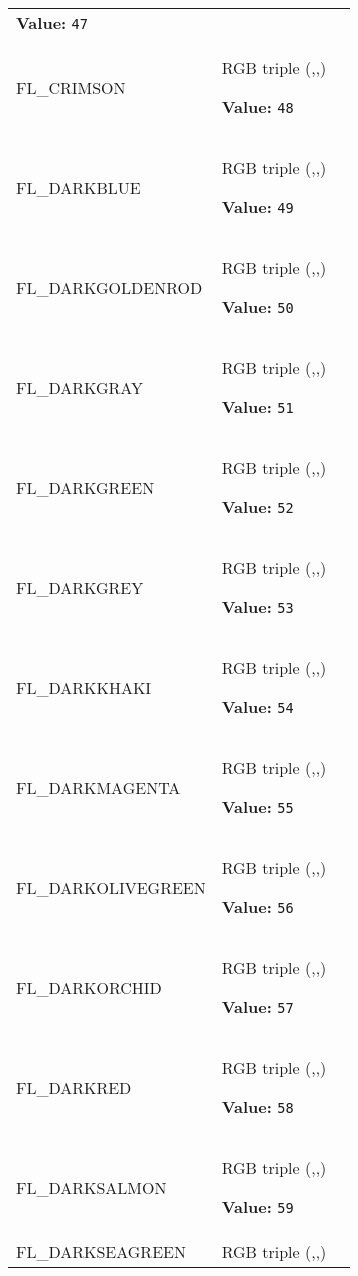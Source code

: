 \begin{longtable}{|p{\varnamewidth}|p{\vardescrwidth}|l}
\textbf{Value:} 
{\tt 47}&\\
\cline{1-2}
\raggedright F\-L\-\_\-C\-R\-I\-M\-S\-O\-N\- & \raggedright RGB triple (,,)

\textbf{Value:} 
{\tt 48}&\\
\cline{1-2}
\raggedright F\-L\-\_\-D\-A\-R\-K\-B\-L\-U\-E\- & \raggedright RGB triple (,,)

\textbf{Value:} 
{\tt 49}&\\
\cline{1-2}
\raggedright F\-L\-\_\-D\-A\-R\-K\-G\-O\-L\-D\-E\-N\-R\-O\-D\- & \raggedright RGB triple (,,)

\textbf{Value:} 
{\tt 50}&\\
\cline{1-2}
\raggedright F\-L\-\_\-D\-A\-R\-K\-G\-R\-A\-Y\- & \raggedright RGB triple (,,)

\textbf{Value:} 
{\tt 51}&\\
\cline{1-2}
\raggedright F\-L\-\_\-D\-A\-R\-K\-G\-R\-E\-E\-N\- & \raggedright RGB triple (,,)

\textbf{Value:} 
{\tt 52}&\\
\cline{1-2}
\raggedright F\-L\-\_\-D\-A\-R\-K\-G\-R\-E\-Y\- & \raggedright RGB triple (,,)

\textbf{Value:} 
{\tt 53}&\\
\cline{1-2}
\raggedright F\-L\-\_\-D\-A\-R\-K\-K\-H\-A\-K\-I\- & \raggedright RGB triple (,,)

\textbf{Value:} 
{\tt 54}&\\
\cline{1-2}
\raggedright F\-L\-\_\-D\-A\-R\-K\-M\-A\-G\-E\-N\-T\-A\- & \raggedright RGB triple (,,)

\textbf{Value:} 
{\tt 55}&\\
\cline{1-2}
\raggedright F\-L\-\_\-D\-A\-R\-K\-O\-L\-I\-V\-E\-G\-R\-E\-E\-N\- & \raggedright RGB triple (,,)

\textbf{Value:} 
{\tt 56}&\\
\cline{1-2}
\raggedright F\-L\-\_\-D\-A\-R\-K\-O\-R\-C\-H\-I\-D\- & \raggedright RGB triple (,,)

\textbf{Value:} 
{\tt 57}&\\
\cline{1-2}
\raggedright F\-L\-\_\-D\-A\-R\-K\-R\-E\-D\- & \raggedright RGB triple (,,)

\textbf{Value:} 
{\tt 58}&\\
\cline{1-2}
\raggedright F\-L\-\_\-D\-A\-R\-K\-S\-A\-L\-M\-O\-N\- & \raggedright RGB triple (,,)

\textbf{Value:} 
{\tt 59}&\\
\cline{1-2}
\raggedright F\-L\-\_\-D\-A\-R\-K\-S\-E\-A\-G\-R\-E\-E\-N\- & \raggedright RGB triple (,,)


\end{longtable}
